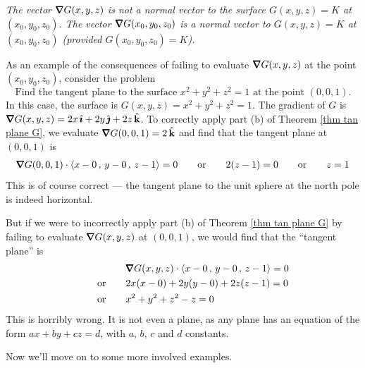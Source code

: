 \begin{warning}\label{warn tan plane}
\emph{The vector $\vnabla G(x,y,z)$ is not a normal vector to the surface
$G(x,y,z)\!=\!K$ at $(x_0,y_0,z_0)$. The vector  $\vnabla G(x_0,y_0,z_0)$ is
a normal vector to $G(x,y,z)\!=\!K$ at $(x_0,y_0,z_0)$
(provided $G(x_0,y_0,z_0)=K$).}

\medskip

As an example of the consequences of failing to evaluate 
$\vnabla G(x,y,z)$ at the point $(x_0,y_0,z_0)$, consider the problem 
\begin{equation*}
\text{Find the tangent plane to the surface 
$x^2+y^2+z^2=1$ at the point $(0,0,1)$.}
\end{equation*}
 In this case,
the surface is $G(x,y,z)=x^2+y^2+z^2=1$. The gradient of $G$ is
$\vnabla G(x,y,z) = 2x\,\hi +2y\,\hj +2z\,\hk$. To correctly apply part (b) 
of Theorem \ref{thm tan plane G}, we evaluate
$\vnabla G(0,0,1) = 2\,\hk$ and find that the tangent plane at $(0,0,1)$ is
\begin{align*}
\vnabla G(0,0,1)\cdot\llt x-0\,,\,y-0\,,\,z-1\rgt =0
\qquad\text{or}\qquad 2(z-1)=0
\qquad\text{or}\qquad z=1
\end{align*}
This is of course correct --- the tangent plane to the unit sphere at the north
pole is indeed horizontal.

\medskip
But if we were to incorrectly apply part (b) of Theorem \ref{thm tan plane G} 
by failing to evaluate $\vnabla G(x,y,z)$ at $(0,0,1)$, we would find that 
the ``tangent plane'' is
\begin{align*}
&\vnabla G(x,y,z)\cdot\llt x-0\,,\,y-0\,,\,z-1\rgt =0 \\
\qquad\text{or}\qquad &2x(x-0) +2y(y-0) + 2z(z-1)=0 \\
\qquad\text{or}\qquad & x^2+y^2+z^2 -z = 0
\end{align*}
This is horribly wrong. It is not even a plane, as any plane has
an equation of the form $ax+by+cz=d$, with $a$, $b$, $c$ and $d$ constants.

\end{warning}

Now we'll move on to some more involved examples.


